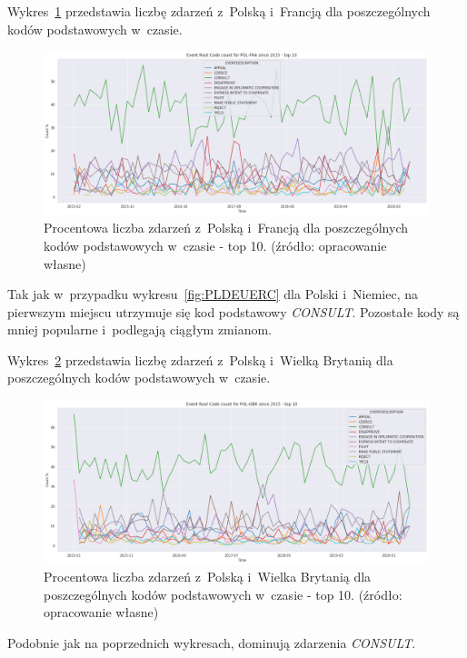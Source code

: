 \documentclass[11pt]{report}
\begin{document}
    Wykres~\ref{fig:PLFRAERC} przedstawia liczbę zdarzeń z~Polską i~Francją dla poszczególnych kodów podstawowych w~czasie.
    \begin{figure}[!htp]
        \centering
        \includegraphics[width=\linewidth]{fig/PL/POLFRAERCperc.png}
        \caption{Procentowa liczba zdarzeń z~Polską i~Francją dla poszczególnych kodów podstawowych w~czasie - top 10. (źródło: opracowanie własne)}
        \label{fig:PLFRAERC}
    \end{figure}
    Tak jak w~przypadku wykresu~\ref{fig:PLDEUERC} dla Polski i~Niemiec, na pierwszym miejscu utrzymuje się kod podstawowy \textit{CONSULT}.
    Pozostałe kody są mniej popularne i~podlegają ciągłym zmianom.

    Wykres~\ref{fig:PLGBRERC} przedstawia liczbę zdarzeń z~Polską i~Wielką Brytanią dla poszczególnych kodów podstawowych w~czasie.
    \begin{figure}[!htp]
        \centering
        \includegraphics[width=\linewidth]{fig/PL/POLGBRERCperc.png}
        \caption{Procentowa liczba zdarzeń z~Polską i~Wielka Brytanią dla poszczególnych kodów podstawowych w~czasie - top 10. (źródło: opracowanie własne)}
        \label{fig:PLGBRERC}
    \end{figure}
    Podobnie jak na poprzednich wykresach, dominują zdarzenia \textit{CONSULT}.
\end{document}

